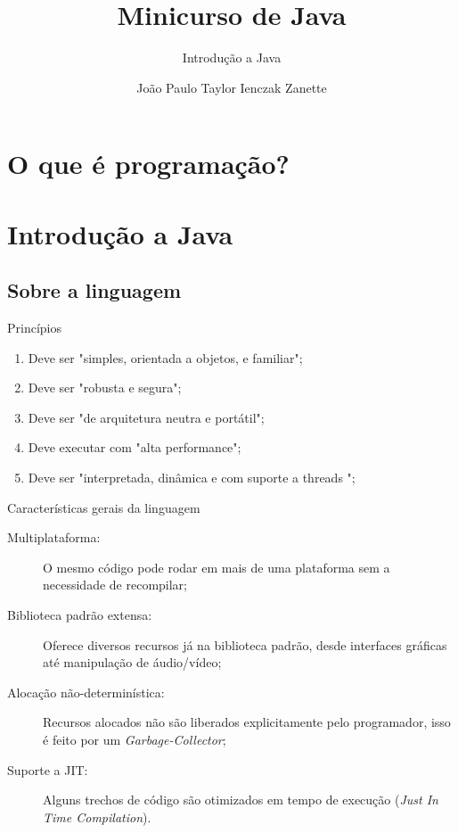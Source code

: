 \documentclass{beamer}
\title{Minicurso de Java}
\subtitle{Introdução a Java}
\author{João Paulo Taylor Ienczak Zanette}
\begin{document}
\maketitle

\section{O que é programação?}

\section{Introdução a Java}
\subsection{Sobre a linguagem}

\begin{frame}{Princípios}
    \begin{enumerate}
        \item Deve ser "simples, orientada a objetos, e familiar";
        \item Deve ser "robusta e segura";
        \item Deve ser "de arquitetura neutra e portátil";
        \item Deve executar com "alta performance";
        \item Deve ser "interpretada, dinâmica e com suporte a threads ";
    \end{enumerate}
\end{frame}


\begin{frame}{Características gerais da linguagem}

    \begin{description}
        \item[Multiplataforma:] O mesmo código pode rodar em mais de uma plataforma
            sem a necessidade de recompilar;
        \item[Biblioteca padrão extensa:] Oferece diversos recursos já na
            biblioteca padrão, desde interfaces gráficas até manipulação de
            áudio/vídeo;
        \item[Alocação não-determinística:] Recursos alocados não são liberados
            explicitamente pelo programador, isso é feito por um
            \emph{Garbage-Collector};
        \item[Suporte a JIT:] Alguns trechos de código são otimizados em tempo de
            execução (\textit{Just In Time Compilation}).
    \end{description}


\end{frame}
\end{document}
